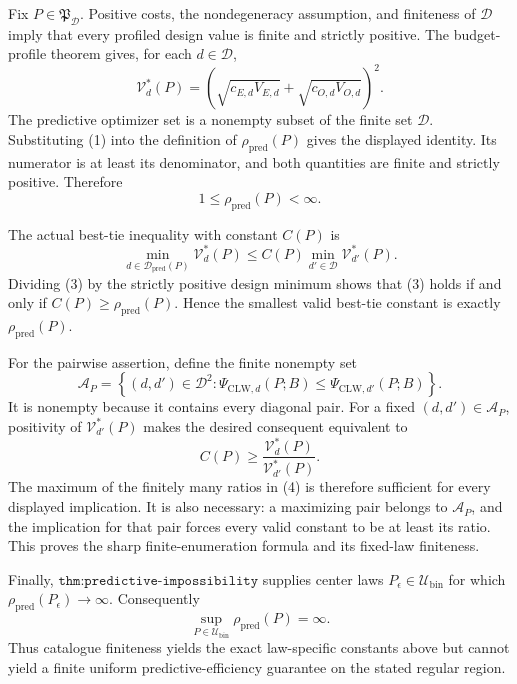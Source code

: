 Fix \(P\in\mathfrak P_{\mathcal D}\).  Positive costs, the nondegeneracy assumption, and finiteness of \(\mathcal D\) imply that every profiled design value is finite and strictly positive.  The budget-profile theorem gives, for each \(d\in\mathcal D\),
\[
 \mathcal V_d^*(P)
 =\left(\sqrt{c_{E,d}V_{E,d}}+
 \sqrt{c_{O,d}V_{O,d}}\right)^2. \tag{1}
\]
The predictive optimizer set is a nonempty subset of the finite set \(\mathcal D\).  Substituting (1) into the definition of \(\rho_{\mathrm{pred}}(P)\) gives the displayed identity.  Its numerator is at least its denominator, and both quantities are finite and strictly positive.  Therefore
\[
 1\le\rho_{\mathrm{pred}}(P)<\infty. \tag{2}
\]

The actual best-tie inequality with constant \(C(P)\) is
\[
 \min_{d\in\mathcal D_{\mathrm{pred}}(P)}\mathcal V_d^*(P)
 \le C(P)\min_{d'\in\mathcal D}\mathcal V_{d'}^*(P). \tag{3}
\]
Dividing (3) by the strictly positive design minimum shows that (3) holds if and only if \(C(P)\ge\rho_{\mathrm{pred}}(P)\).  Hence the smallest valid best-tie constant is exactly \(\rho_{\mathrm{pred}}(P)\).

For the pairwise assertion, define the finite nonempty set
\[
 \mathcal A_P=\left\{(d,d')\in\mathcal D^2:
 \Psi_{\mathrm{CLW},d}(P;B)
 \le\Psi_{\mathrm{CLW},d'}(P;B)\right\}.
\]
It is nonempty because it contains every diagonal pair.  For a fixed \((d,d')\in\mathcal A_P\), positivity of \(\mathcal V_{d'}^*(P)\) makes the desired consequent equivalent to
\[
 C(P)\ge\frac{\mathcal V_d^*(P)}{\mathcal V_{d'}^*(P)}. \tag{4}
\]
The maximum of the finitely many ratios in (4) is therefore sufficient for every displayed implication.  It is also necessary: a maximizing pair belongs to \(\mathcal A_P\), and the implication for that pair forces every valid constant to be at least its ratio.  This proves the sharp finite-enumeration formula and its fixed-law finiteness.

Finally, \(\texttt{thm:predictive-impossibility}\) supplies center laws \(P_\epsilon\in\mathcal U_{\mathrm{bin}}\) for which \(\rho_{\mathrm{pred}}(P_\epsilon)\to\infty\).  Consequently
\[
 \sup_{P\in\mathcal U_{\mathrm{bin}}}\rho_{\mathrm{pred}}(P)=\infty.
\]
Thus catalogue finiteness yields the exact law-specific constants above but cannot yield a finite uniform predictive-efficiency guarantee on the stated regular region.